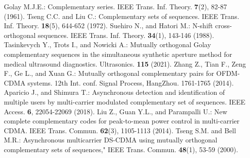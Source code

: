 \documentclass[11pt]{article}
\newcommand{\2} {$2$-to-$1$}
\begin{document}
\begin{thebibliography}{1}
  Golay  M.J.E.: Complementary series. IEEE Trans. Inf. Theory. \textbf{7}(2), 82-87 (1961).
  Tseng C.C.  and Liu C.: Complementary sets of sequences. IEEE Trans. Inf. Theory. \textbf{18}(5), 644-652 (1972).
	Suehiro N., and Hatori M.: N-shift cross-orthogonal sequences. IEEE Trans. Inf. Theory. \textbf{34}(1), 143-146 (1988).
  Tasinkevych Y., Trots I., and Nowicki A.:  Mutually orthogonal Golay complementary sequences in the simultaneous synthetic aperture method for medical ultrasound diagnostics. Ultrasonics.  \textbf{115} (2021).
	Zhang Z., Tian F., Zeng F., Ge L., and Xuan G.: Mutually orthogonal complementary pairs for OFDM-CDMA systems. 12th Int. conf. Signal Process, HangZhou. 1761-1765 (2014).
	Aparicio J., and Shimura T.: Asynchronous detection and identification of multiple users by multi-carrier modulated complementary set of sequences.  IEEE Access.  \textbf{6}, 22054-22069 (2018).
	Liu Z., Guan Y.L., and Parampalli U.: New complete complementary codes for peak-to-mean power control in multi-carrier CDMA. IEEE Trans. Commun. \textbf{62}(3), 1105-1113 (2014).
	Tseng S.M.  and Bell M.R.: Asynchronous multicarrier DS-CDMA using mutually orthogonal complementary sets of sequences," IEEE Trans. Commun. \textbf{48}(1), 53-59 (2000).


\end{thebibliography}
\end{document}
